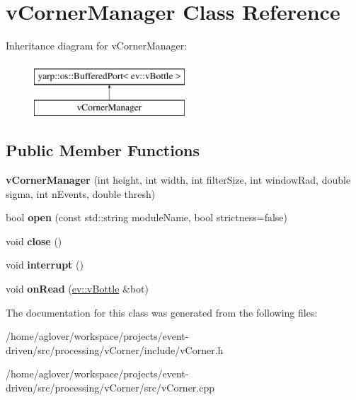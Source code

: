 \hypertarget{classvCornerManager}{}\section{v\+Corner\+Manager Class Reference}
\label{classvCornerManager}
Inheritance diagram for v\+Corner\+Manager\+:\begin{figure}[H]
\begin{center}
\leavevmode
\includegraphics[height=2.000000cm]{classvCornerManager}
\end{center}
\end{figure}
\subsection*{Public Member Functions}
\begin{DoxyCompactItemize}
\item 
{\bfseries v\+Corner\+Manager} (int height, int width, int filter\+Size, int window\+Rad, double sigma, int n\+Events, double thresh)\hypertarget{classvCornerManager_a08e80ac3aafada6b2719cee91649cfa6}{}\label{classvCornerManager_a08e80ac3aafada6b2719cee91649cfa6}

\item 
bool {\bfseries open} (const std\+::string module\+Name, bool strictness=false)\hypertarget{classvCornerManager_ae87a3b35a1047404536af869dd837621}{}\label{classvCornerManager_ae87a3b35a1047404536af869dd837621}

\item 
void {\bfseries close} ()\hypertarget{classvCornerManager_acf1440f33d67878234673e9d4d65a5bf}{}\label{classvCornerManager_acf1440f33d67878234673e9d4d65a5bf}

\item 
void {\bfseries interrupt} ()\hypertarget{classvCornerManager_a360ad86c3e051d7f452bdb4c8d82b28d}{}\label{classvCornerManager_a360ad86c3e051d7f452bdb4c8d82b28d}

\item 
void {\bfseries on\+Read} (\hyperlink{classev_1_1vBottle}{ev\+::v\+Bottle} \&bot)\hypertarget{classvCornerManager_aa67c8b6ded0b19419b294896ddee1803}{}\label{classvCornerManager_aa67c8b6ded0b19419b294896ddee1803}

\end{DoxyCompactItemize}


The documentation for this class was generated from the following files\+:\begin{DoxyCompactItemize}
\item 
/home/aglover/workspace/projects/event-\/driven/src/processing/v\+Corner/include/v\+Corner.\+h\item 
/home/aglover/workspace/projects/event-\/driven/src/processing/v\+Corner/src/v\+Corner.\+cpp\end{DoxyCompactItemize}
